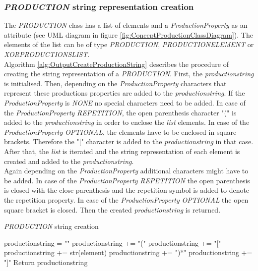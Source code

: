 \subsubsection{\textit{PRODUCTION} string representation creation}

The \textit{PRODUCTION} class has a list of elements and a \textit{ProductionProperty} as an attribute (see UML diagram in figure \ref{fig:ConceptProductionClassDiagram}).
The elements of the list can be of type \textit{PRODUCTION}, \textit{PRODUCTION\textunderscore ELEMENT} or \textit{XOR\textunderscore PRODUCTIONS\textunderscore LIST}.\\
Algorithm \ref{alg:OutputCreateProductionString} describes the procedure of creating the string representation of a \textit{PRODUCTION}.
First, the \textit{production\textunderscore string} is initialised.
Then, depending on the \textit{ProductionProperty} characters that represent these productions properties are added to the \textit{production\textunderscore string}.
If the \textit{ProductionProperty} is \textit{NONE} no special characters need to be added.
In case of the \textit{ProductionProperty} \textit{REPETITION}, the open parenthesis character "(" is added to the \textit{production\textunderscore string} in order to enclose the \textit{list} elements.
In case of the \textit{ProductionProperty} \textit{OPTIONAL}, the elements have to be enclosed in square brackets. Therefore the "[" character is added to the \textit{production\textunderscore string} in that case.\\
After that, the \textit{list} is iterated and the string representation of each element is created and added to the \textit{production\textunderscore string}.\\
Again depending on the \textit{ProductionProperty} additional characters might have to be added.
In case of the \textit{ProductionProperty} \textit{REPETITION} the open parenthesis is closed with the close parenthesis and the repetition symbol is added to denote the repetition property.
In case of the \textit{ProductionProperty} \textit{OPTIONAL} the open square bracket is closed.
Then the created \textit{production\textunderscore string} is returned.

\begin{algorithm}[H]
\caption{\textit{PRODUCTION} string creation}
\label{alg:OutputCreateProductionString}
\begin{algorithmic}[1]
\State production\textunderscore string = ""
	\State production\textunderscore string += "("
	\State production\textunderscore string += "["
\EndIf
{}
		\State production\textunderscore string += str(element)
\EndFor
{}
	\State production\textunderscore string += ")*"
	\State production\textunderscore string += "]"
\EndIf
\State Return production\textunderscore string
\end{algorithmic}
\end{algorithm}

